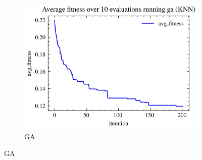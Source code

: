 \begin{figure}[H]
\begin{subfigure}[b]{0.3\textwidth}
        \includegraphics[width=\textwidth]{imagenes/binary_knn_fitness/KNN_fitness_over_10_evaluations_ga_binary_breast-cancer.jpg}
        \caption{GA}
        \label{fig:sub9}
    \end{subfigure}


\end{figure}
